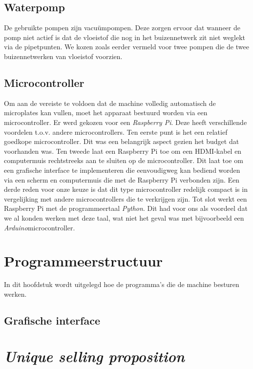 \documentclass[a4paper,twoside,kulak]{kulakreport} %
\begin{document}
\section{Waterpomp}

De gebruikte pompen zijn vacuümpompen. Deze zorgen ervoor dat wanneer de pomp niet actief is dat de vloeistof die nog in het buizennetwerk zit niet weglekt via de pipetpunten. We kozen zoals eerder vermeld voor twee pompen die de twee buizennetwerken van vloeistof voorzien. 

\section{Microcontroller}

Om aan de vereiste te voldoen dat de machine volledig automatisch de microplates kan vullen, moet het apparaat bestuurd worden via een microcontroller. Er werd gekozen voor een \textit{Raspberry Pi}. Deze heeft verschillende voordelen t.o.v. andere microcontrollers. Ten eerste punt is het een relatief goedkope microcontroller. Dit was een belangrijk aspect gezien het budget dat voorhanden was. Ten tweede laat een Raspberry Pi toe om een HDMI-kabel en computermuis rechtstreeks aan te sluiten op de microcontroller. Dit laat toe om een grafische interface te implementeren die eenvoudigweg kan bediend worden via een scherm en computermuis die met de Raspberry Pi verbonden zijn. Een derde reden voor onze keuze is dat dit type microcontroller redelijk compact is in vergelijking met andere microcontrollers die te verkrijgen zijn. Tot slot werkt een Raspberry Pi met de programmeertaal \textit{Python}. Dit had voor ons als voordeel dat we al konden werken met deze taal, wat niet het geval was met bijvoorbeeld een \textit{Arduino}microcontroller. 



\chapter{Programmeerstructuur}

In dit hoofdstuk wordt uitgelegd hoe de programma's die de machine besturen werken.

\section{Grafische interface}

\chapter{\textit{Unique selling proposition}}
\end{document}
